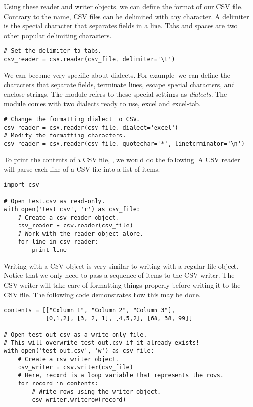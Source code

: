 Using these reader and writer objects, we can define the format of our CSV file.
Contrary to the name, CSV files can be delimited with any character.
A delimiter is the special character that separates fields in a line.
Tabs and spaces are two other popular delimiting characters.
\begin{lstlisting}
# Set the delimiter to tabs.
csv_reader = csv.reader(csv_file, delimiter='\t')
\end{lstlisting}

We can become very specific about dialects.
For example, we can define the characters that separate fields, terminate lines, escape special characters, and enclose strings.
The  module refers to these special settings as \emph{dialects}.
The module comes with two dialects ready to use, excel and excel-tab.
\begin{lstlisting}
# Change the formatting dialect to CSV.
csv_reader = csv.reader(csv_file, dialect='excel')
# Modify the formatting characters.
csv_reader = csv.reader(csv_file, quotechar='*', lineterminator='\n')

\end{lstlisting}

To print the contents of a CSV file, , we would do the following.  A CSV reader will parse each line of a CSV file into a list of items.
\begin{lstlisting}
import csv

# Open test.csv as read-only.
with open('test.csv', 'r') as csv_file:
    # Create a csv reader object.
    csv_reader = csv.reader(csv_file)
    # Work with the reader object alone.
    for line in csv_reader:
        print line
\end{lstlisting}

Writing with a CSV  object is very similar to writing with a regular file object.  Notice that we only need to pass a sequence of items to the CSV writer.  The CSV writer will take care of formatting things properly before writing it to the CSV file.
The following code demonstrates how this may be done.
\begin{lstlisting}
contents = [["Column 1", "Column 2", "Column 3"],
            [0,1,2], [3, 2, 1], [4,5,2], [68, 38, 99]]

# Open test_out.csv as a write-only file.
# This will overwrite test_out.csv if it already exists!
with open('test_out.csv', 'w') as csv_file:
    # Create a csv writer object.
    csv_writer = csv.writer(csv_file)
    # Here, record is a loop variable that represents the rows.
    for record in contents:
        # Write rows using the writer object.
        csv_writer.writerow(record)
\end{lstlisting}

